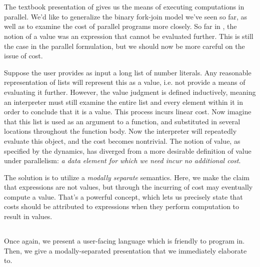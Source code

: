 \section{\LangPPCF{}}

The textbook presentation of \LangPCF{} gives us the means of executing computations in
parallel. We'd like to generalize the binary fork-join model we've seen so far, as well as to
examine the cost of parallel programs more closely. So far in \LangPCF{}, the notion of a value
was an expression that cannot be evaluated further. This is still the case in the parallel
formulation, but we should now be more careful on the issue of cost.

Suppose the user provides as input a long list of number literals. Any reasonable representation
of lists will represent this as a value, i.e. not provide a means of evaluating it further.
However, the value judgment is defined inductively, meaning an interpreter must still examine the
entire list and every element within it in order to conclude that it is a value. This process
incurs linear cost. Now imagine that this list is used as an argument to a function, and
substituted in several locations throughout the function body. Now the interpreter will repeatedly
evaluate this object, and the cost becomes nontrivial. The notion of value, as specified by the
dynamics, has diverged from a more desirable definition of value under parallelism:
\emph{a data element for which we need incur no additional cost}.

The solution is to utilize a \emph{modally separate} semantics.
Here, we make the claim that expressions are not values, but through the incurring of cost
may eventually compute a value. That's a powerful concept, which lets us precisely state that costs
should be attributed to expressions when they perform computation to result in values.

\clearpage

\subsection{\LangPPCF{}}

Once again, we present a user-facing language \LangPPCF{} which is friendly to program in.
Then, we give a modally-separated presentation \LangPPCFv{} that we immediately elaborate to.

